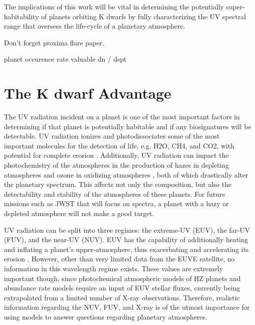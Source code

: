 \documentclass[twocolumn]{aastex62}
\begin{document}
The implications of this work will be vital in determining the potentially super-habitability of planets orbiting K dwarfs by fully characterizing the UV spectral range that oversees the life-cycle of a planetary atmosphere.

Don't forget proxima flare paper.


planet occurence rate valuable
dn / dspt

\section{The K dwarf Advantage}\label{sec:advantage}

The UV radiation incident on a planet is one of the most important factors in determining if that planet is potentially habitable and if any biosignatures will be detectable. UV radiation ionizes and photodissociates some of the most important molecules for the detection of life, e.g. H2O, CH4, and CO2, with potential for complete erosion \citep[e.g.][]{Kasting1993, Lichtenegger2010, Segura2010, Hu2012}. Additionally, UV radiation can impact the photochemistry of the atmospheres in the production of hazes in depleting atmospheres \citep{Zerkle2012, Arney2017}
and ozone in oxidizing atmospheres \citep{Segura2003, Segura2005}, both of which drastically alter the planetary spectrum. This affects not only the composition, but also the detectability and stability of the atmospheres of these planets. For future missions such as JWST that will focus on spectra, a planet with a hazy or depleted atmosphere will not make a good target.

UV radiation can be split into three regimes: the extreme-UV (EUV), the far-UV (FUV), and the near-UV (NUV). EUV has the capability of additionally heating and inflating a planet’s upper-atmosphere, thus exacerbating and accelerating its erosion \citep{Koskinen2010, Lammer2007}. However, other than very limited data from the EUVE satellite, no information in this wavelength regime exists. These values are extremely important though, since photochemical atmospheric models of HZ planets and abundance rate models require an input of EUV stellar fluxes, currently being extrapolated from a limited number of X-ray observations. Therefore, realistic information regarding the NUV, FUV, and X-ray is of the utmost importance for using models to answer questions regarding planetary atmospheres. 
\end{document}
